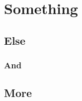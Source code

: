 \chapter{Something} %

\blindtext[2]

\section{Else}

\subsection{And}
\blindtext[1]

\section{More}
\blindtext[1]
